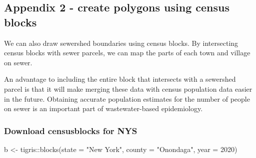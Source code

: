 \documentclass[
]{book}
\newenvironment{Shaded}{\begin{snugshade}}{\end{snugshade}}
\newcommand{\AttributeTok}[1]{\textcolor[rgb]{0.77,0.63,0.00}{#1}}
\newcommand{\DecValTok}[1]{\textcolor[rgb]{0.00,0.00,0.81}{#1}}
\newcommand{\FunctionTok}[1]{\textcolor[rgb]{0.00,0.00,0.00}{#1}}
\newcommand{\NormalTok}[1]{#1}
\newcommand{\OtherTok}[1]{\textcolor[rgb]{0.56,0.35,0.01}{#1}}
\newcommand{\SpecialCharTok}[1]{\textcolor[rgb]{0.00,0.00,0.00}{#1}}
\newcommand{\StringTok}[1]{\textcolor[rgb]{0.31,0.60,0.02}{#1}}
\begin{document}
\hypertarget{appendix-2---create-polygons-using-census-blocks}{%
\subsection{Appendix 2 - create polygons using census blocks}\label{appendix-2---create-polygons-using-census-blocks}}

We can also draw sewershed boundaries using census blocks. By intersecting census blocks with sewer parcels, we can map the parts of each town and village on sewer.

An advantage to including the entire block that intersects with a sewershed parcel is that it will make merging these data with census population data easier in the future. Obtaining accurate population estimates for the number of people on sewer is an important part of wastewater-based epidemiology.

\hypertarget{download-censusblocks-for-nys}{%
\subsubsection{Download censusblocks for NYS}\label{download-censusblocks-for-nys}}

\begin{Shaded}
\begin{Highlighting}[]
\NormalTok{b }\OtherTok{\textless{}{-}}\NormalTok{ tigris}\SpecialCharTok{::}\FunctionTok{blocks}\NormalTok{(}\AttributeTok{state =} \StringTok{"New York"}\NormalTok{, }\AttributeTok{county =} \StringTok{"Onondaga"}\NormalTok{, }\AttributeTok{year =} \DecValTok{2020}\NormalTok{)}
\end{Highlighting}
\end{Shaded}
\end{document}
